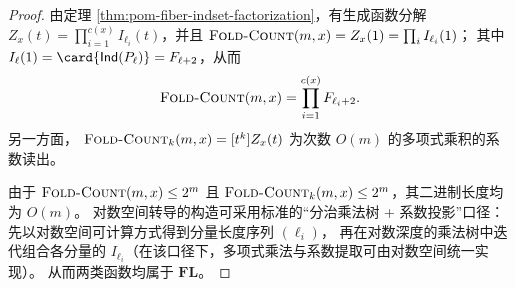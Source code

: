 \begin{proof}
由定理 \ref{thm:pom-fiber-indset-factorization}，有生成函数分解
\(
Z_x(t)=\prod_{i=1}^{c(x)} I_{\ell_i}(t)
\)，并且
\(
\textsc{Fold-Count}(m,x)=Z_x(1)=\prod_i I_{\ell_i}(1)
\)；
其中 \(I_{\ell}(1)=\card{\mathsf{Ind}(P_\ell)}=F_{\ell+2}\)，从而
\[
\textsc{Fold-Count}(m,x)=\prod_{i=1}^{c(x)}F_{\ell_i+2}.
\]
另一方面，
\(
\textsc{Fold-Count}_k(m,x)=[t^k]Z_x(t)
\)
为次数 \(O(m)\) 的多项式乘积的系数读出。
\par
由于 \(\textsc{Fold-Count}(m,x)\le 2^m\) 且 \(\textsc{Fold-Count}_k(m,x)\le 2^m\)，其二进制长度均为 \(O(m)\)。
对数空间转导的构造可采用标准的“分治乘法树 + 系数投影”口径：先以对数空间可计算方式得到分量长度序列 \((\ell_i)\)，
再在对数深度的乘法树中迭代组合各分量的 \(I_{\ell_i}\)（在该口径下，多项式乘法与系数提取可由对数空间统一实现）。
从而两类函数均属于 \(\mathbf{FL}\)。
\end{proof}

\endinput

